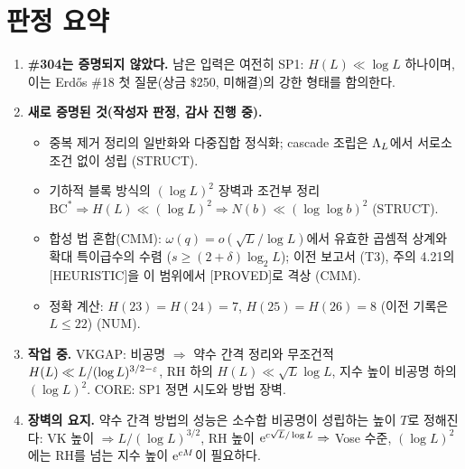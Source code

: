 \section*{판정 요약}
\begin{tcolorbox}[colback=blue!3,colframe=blue!50!black,title={\bfseries 최종 판정 (중간판 기준)}]
\begin{enumerate}[leftmargin=1.4em,itemsep=2pt]
\item \textbf{\#304는 증명되지 않았다.} \OPEN{} 남은 입력은 여전히 SP1: $H(L)\ll\log L$ 하나이며, 이는 Erdős \#18 첫 질문(상금 \$250, 미해결)의 강한 형태를 함의한다.
\item \textbf{새로 증명된 것(작성자 판정, 감사 진행 중).}
 \begin{itemize}[leftmargin=1.2em]
 \item 중복 제거 정리의 일반화와 다중집합 정식화; cascade 조립은 $\Lambda_L$에서 서로소 조건 없이 성립 (STRUCT).
 \item 기하적 블록 방식의 $(\log L)^2$ 장벽과 조건부 정리 $\mathrm{BC}^*\Rightarrow H(L)\ll(\log L)^2\Rightarrow N(b)\ll(\log\log b)^2$ (STRUCT).
 \item 합성 법 혼합(CMM): $\omega(q)=o(\sqrt L/\log L)$에서 유효한 곱셈적 상계와 확대 특이급수의 수렴 ($s\ge(2+\delta)\log_2L$); 이전 보고서 (T3), 주의 4.21의 [HEURISTIC]을 이 범위에서 [PROVED]로 격상 (CMM).
 \item 정확 계산: $H(23)=H(24)=7$, $H(25)=H(26)=8$ (이전 기록은 $L\le22$) (NUM).
 \end{itemize}
\item \textbf{작업 중.} VKGAP: 비공명 $\Rightarrow$ 약수 간격 정리와 무조건적 $H(L)\ll L/(\log L)^{3/2-\varepsilon}$, RH 하의 $H(L)\ll\sqrt L\log L$, 지수 높이 비공명 하의 $(\log L)^2$. CORE: SP1 정면 시도와 방법 장벽.
\item \textbf{장벽의 요지.} \HEUR{} 약수 간격 방법의 성능은 소수합 비공명이 성립하는 높이 $T$로 정해진다: VK 높이 $\Rightarrow L/(\log L)^{3/2}$, RH 높이 $\mathrm{e}^{c\sqrt L/\log L}\Rightarrow$ Vose 수준, $(\log L)^2$에는 RH를 넘는 지수 높이 $\mathrm{e}^{cM}$이 필요하다.
\end{enumerate}
\end{tcolorbox}

